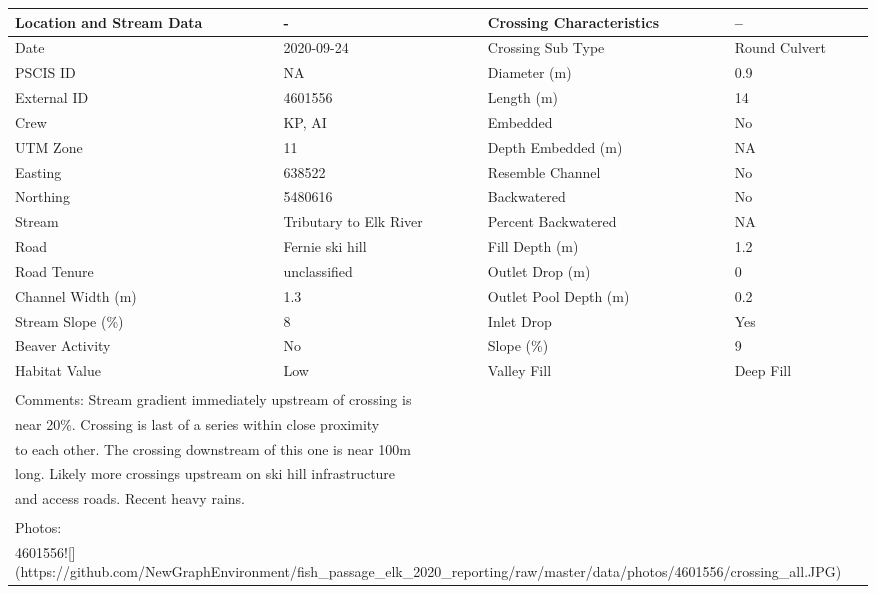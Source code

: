 \documentclass[
]{book}
\begin{document}
\begin{tabular}{l|l|l|l}
\hline
Location and Stream Data & - & Crossing Characteristics & --\\
\hline
Date & 2020-09-24 & Crossing Sub Type & Round Culvert\\
\hline
PSCIS ID & NA & Diameter (m) & 0.9\\
\hline
External ID & 4601556 & Length (m) & 14\\
\hline
Crew & KP, AI & Embedded & No\\
\hline
UTM Zone & 11 & Depth Embedded (m) & NA\\
\hline
Easting & 638522 & Resemble Channel & No\\
\hline
Northing & 5480616 & Backwatered & No\\
\hline
Stream & Tributary to Elk River & Percent Backwatered & NA\\
\hline
Road & Fernie ski hill & Fill Depth (m) & 1.2\\
\hline
Road Tenure & unclassified & Outlet Drop (m) & 0\\
\hline
Channel Width (m) & 1.3 & Outlet Pool Depth (m) & 0.2\\
\hline
Stream Slope (\%) & 8 & Inlet Drop & Yes\\
\hline
Beaver Activity & No & Slope (\%) & 9\\
\hline
Habitat Value & Low & Valley Fill & Deep Fill\\
\hline
\multicolumn{4}{l}{\textsuperscript{} Comments: Stream gradient immediately upstream of crossing is}\\
\multicolumn{4}{l}{near 20\%. Crossing is last of a series within close proximity}\\
\multicolumn{4}{l}{to each other. The crossing downstream of this one is near 100m}\\
\multicolumn{4}{l}{long. Likely more crossings upstream on ski hill infrastructure}\\
\multicolumn{4}{l}{and access roads. Recent heavy rains.}\\
\multicolumn{4}{l}{\textsuperscript{} Photos:}\\
\multicolumn{4}{l}{4601556![](https://github.com/NewGraphEnvironment/fish\_passage\_elk\_2020\_reporting/raw/master/data/photos/4601556/crossing\_all.JPG)}\\
\end{tabular}
\end{document}
